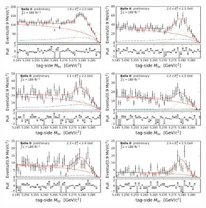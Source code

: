 \begin{figure}[htbp!]
    \includegraphics[width=0.45\textwidth]{fitting/plots/MbcFit_1p8to2p0_data_pub.pdf}
    \includegraphics[width=0.45\textwidth]{fitting/plots/MbcFit_2p0to2p1_data_pub.pdf}
    \includegraphics[width=0.45\textwidth]{fitting/plots/MbcFit_2p1to2p2_data_pub.pdf}
    \includegraphics[width=0.45\textwidth]{fitting/plots/MbcFit_2p2to2p3_data_pub.pdf}
    \includegraphics[width=0.45\textwidth]{fitting/plots/MbcFit_2p3to2p4_data_pub.pdf}
    \includegraphics[width=0.45\textwidth]{fitting/plots/MbcFit_2p4to2p5_data_pub.pdf}

\end{figure}
